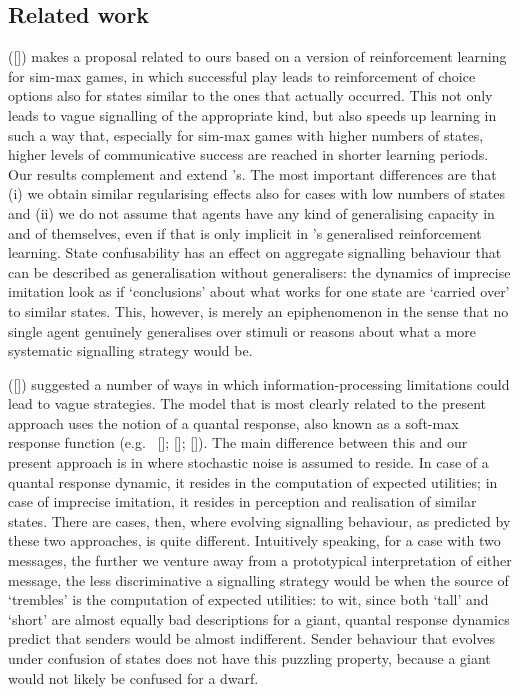 \documentclass[12pt,english]{article}
\numberwithin{equation}{section}
\newcommand{\citetbjps}[1]{\citeauthor{#1} ([\citeyear{#1}])}
\newcommand{\citealtbjps}[1]{\citeauthor{#1} [\citeyear{#1}]}
\begin{document}
\subsection{Related work}
\citetbjps{OConnor2013:The-Evolution-o} makes a proposal related to ours based on a version of
reinforcement learning for sim-max games, in which successful play leads to reinforcement of
choice options also for states similar to the ones that actually occurred. This not only leads
to vague signalling of the appropriate kind, but also speeds up learning in such a way that,
especially for sim-max games with higher numbers of states, higher levels of communicative
success are reached in shorter learning periods. Our results complement and extend
\citeauthor{OConnor2013:The-Evolution-o}'s. The most important differences are that (i) we obtain
similar regularising effects also for cases with low numbers of states and (ii) we do not assume that
agents have any kind of generalising capacity in and of themselves, even if that is only
implicit in \citeauthor{OConnor2013:The-Evolution-o}'s generalised reinforcement learning.
State confusability has an effect on aggregate signalling behaviour that can be described as
generalisation without generalisers: the dynamics of imprecise imitation look as if
`conclusions' about what works for one state are `carried over' to similar states. This,
however, is merely an epiphenomenon in the sense that no single agent genuinely generalises
over stimuli or reasons about what a more systematic signalling strategy would be.


\citetbjps{FrankeJager2010:Vagueness-Signa} suggested a number of ways in which
in\-for\-ma\-tion-processing limitations could lead to vague strategies. The model that is most
clearly related to the present approach uses the notion of a quantal response, also
known as a soft-max response function
(e.g.~\citealtbjps{Luce1959:Individual-Choi}; \citealtbjps{McFadden1976:Quantal-Choice-}; \citealtbjps{GoereeHolt2008:Quantal-Respons}). The
main difference between this and our present approach is in where stochastic noise is assumed
to reside. In case of a quantal response dynamic, it resides in the computation of expected utilities;
in case of imprecise imitation, it resides in perception and realisation of similar states. There are
cases, then, where evolving signalling behaviour, as predicted by these two approaches, is quite
different. Intuitively speaking, for a case with two messages, the further we venture away from
a prototypical interpretation of either message, the less discriminative a signalling strategy
would be when the source of `trembles' is the computation of expected utilities: to wit,
since both `tall' and `short' are almost equally bad descriptions for a giant, quantal
response dynamics predict that senders would be almost indifferent. Sender behaviour that
evolves under confusion of states does not have this puzzling property, because a giant would
not likely be confused for a dwarf. 
\end{document}
